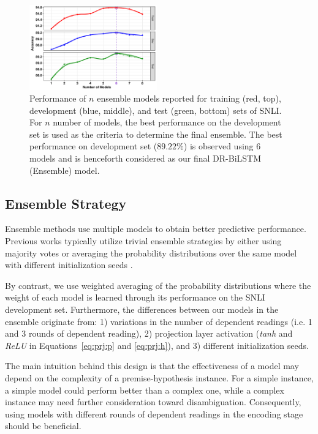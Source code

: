 \documentclass[11pt,a4paper]{article}
\begin{document}
	\begin{figure}[ht]
		\centering
		\includegraphics[width=0.49\textwidth ]{Ensemble_trend.pdf}
		\caption{Performance of $n$ ensemble models reported for training (red, top), development (blue, middle), and test (green, bottom) sets of SNLI. For $n$ number of models, the best performance on the development set is used as the criteria to determine the final ensemble. The best performance on development set ($89.22\%$) is observed using 6 models and is henceforth considered as our final DR-BiLSTM (Ensemble) model. \label{fig:ensemble}}
	\end{figure}
	
	\subsection{Ensemble Strategy} \label{sec:es}
	Ensemble methods use multiple models to obtain better predictive performance. Previous works typically utilize trivial ensemble strategies by either using majority votes or averaging the probability distributions over the same model with different initialization seeds \cite{ibm2017,gong2017}. 
	
	By contrast, we use weighted averaging of the probability distributions where the weight of each model is learned through its performance on the SNLI development set. Furthermore, the differences between our models in the ensemble originate from: 1) variations in the number of dependent readings (i.e. 1 and 3 rounds of dependent reading), 2) projection layer activation (\emph{tanh} and \emph{ReLU} in Equations~\ref{eq:prj:p} and \ref{eq:prj:h}), and 3) different initialization seeds. 
	
	The main intuition behind this design is that the effectiveness of a model may depend on the complexity of a premise-hypothesis instance. For a simple instance, a simple model could perform better than a complex one, while a complex instance may need further consideration toward disambiguation. Consequently, using models with different rounds of dependent readings in the encoding stage should be beneficial. 
	
\end{document}

